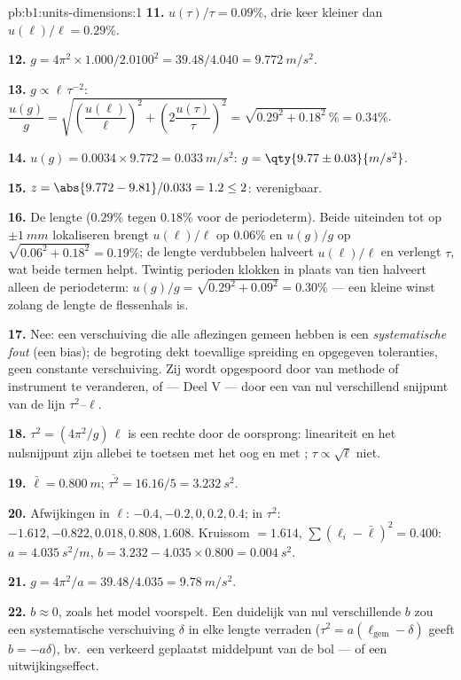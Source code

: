 \begin{solution}{pb:b1:units-dimensions:1}
\textbf{11.} $u(\tau)/\tau = 0.09\%$, drie keer kleiner dan
$u(\ell)/\ell = 0.29\%$.

\textbf{12.} $g = 4\pi^2 \times 1.000/2.0100^2 = 39.48/4.040 =
\qty{9.772}{m/s^2}$.

\textbf{13.} $g \propto \ell\,\tau^{-2}$:
$\dfrac{u(g)}{g} = \sqrt{\left(\dfrac{u(\ell)}{\ell}\right)^2
+ \left(2\dfrac{u(\tau)}{\tau}\right)^2} = \sqrt{0.29^2 + 0.18^2}\,\%
= 0.34\%$.

\textbf{14.} $u(g) = 0.0034 \times 9.772 = \qty{0.033}{m/s^2}$:
$g = \qty{9.77\pm0.03}{m/s^2}$.

\textbf{15.} $z = \abs{9.772 - 9.81}/0.033 = 1.2 \leq 2$: verenigbaar.

\textbf{16.} De lengte ($0.29\%$ tegen $0.18\%$ voor de periodeterm).
Beide uiteinden tot op $\pm\qty{1}{mm}$ lokaliseren brengt $u(\ell)/\ell$ op
$0.06\%$ en $u(g)/g$ op $\sqrt{0.06^2 + 0.18^2} = 0.19\%$; de lengte
verdubbelen halveert $u(\ell)/\ell$ en verlengt $\tau$, wat beide termen
helpt. Twintig perioden klokken in plaats van tien halveert alleen de
periodeterm: $u(g)/g = \sqrt{0.29^2 + 0.09^2} = 0.30\%$ --- een kleine winst
zolang de lengte de flessenhals is.

\textbf{17.} Nee: een verschuiving die alle aflezingen gemeen hebben is een
\emph{systematische fout} (een bias); de begroting dekt toevallige spreiding
en opgegeven toleranties, geen constante verschuiving. Zij wordt opgespoord
door van methode of instrument te veranderen, of --- Deel V --- door een van
nul verschillend snijpunt van de lijn $\tau^2$--$\ell$.

\textbf{18.} $\tau^2 = (4\pi^2/g)\,\ell$ is een rechte door de
oorsprong: lineariteit en het nulsnijpunt zijn allebei te toetsen met het oog
en met ; $\tau \propto \sqrt\ell$ niet.

\textbf{19.} $\bar\ell = \qty{0.800}{m}$; $\overline{\tau^2} = 16.16/5 =
\qty{3.232}{s^2}$.

\textbf{20.} Afwijkingen in $\ell$: $-0.4, -0.2, 0, 0.2, 0.4$; in
$\tau^2$: $-1.612, -0.822, 0.018, 0.808, 1.608$. Kruissom $= 1.614$,
$\sum(\ell_i - \bar\ell)^2 = 0.400$: $a = \qty{4.035}{s^2/m}$,
$b = 3.232 - 4.035 \times 0.800 = \qty{0.004}{s^2}$.

\textbf{21.} $g = 4\pi^2/a = 39.48/4.035 = \qty{9.78}{m/s^2}$.

\textbf{22.} $b \approx 0$, zoals het model voorspelt. Een duidelijk van nul
verschillende $b$ zou een systematische verschuiving $\delta$ in elke lengte
verraden ($\tau^2 = a(\ell_{\text{gem}} - \delta)$ geeft $b = -a\delta$), bv.\ een
verkeerd geplaatst middelpunt van de bol --- of een uitwijkingseffect.


\end{solution}
